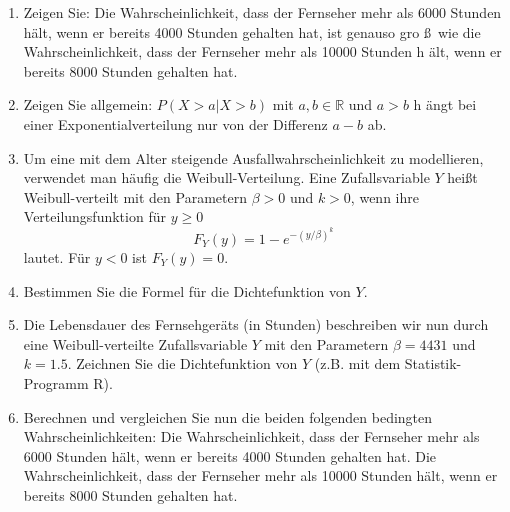 \begin{enumerate}
\begin{enumerate}
\item Zeigen Sie: Die Wahrscheinlichkeit, dass der Fernseher mehr als 6000
Stunden h\"{a}lt, wenn er bereits 4000 Stunden gehalten hat, ist genauso gro%
\ss\ wie die Wahrscheinlichkeit, dass der Fernseher mehr als 10000 Stunden h%
\"{a}lt, wenn er bereits 8000 Stunden gehalten hat.
\item Zeigen Sie allgemein: $P(X>a|X>b)$ mit $a,b\in \mathbb{R}$ und $a>b$ h%
\"{a}ngt bei einer Exponentialverteilung nur von der Differenz $a-b$ ab.
\item Um eine mit dem Alter steigende Ausfallwahrscheinlichkeit zu
modellieren, verwendet man h\"{a}ufig die Weibull-Verteilung. Eine
Zufallsvariable $Y$ hei\ss t Weibull-verteilt mit den Parametern $\beta >0$
und $k>0$, wenn ihre Verteilungsfunktion f\"{u}r $y\geq 0$%
\begin{equation*}
F_{Y}(y)=1-e^{-(y/\beta )^{k}}
\end{equation*}%
lautet. F\"{u}r $y<0$ ist $F_{Y}(y)=0$.
\item Bestimmen Sie die Formel f\"{u}r die Dichtefunktion von $Y$.
\item Die Lebensdauer des Fernsehger\"{a}ts (in Stunden) beschreiben wir nun
durch eine Weibull-verteilte Zufallsvariable $Y$ mit den Parametern $\beta
=4431$ und $k=1.5.$ Zeichnen Sie die Dichtefunktion von $Y$ (z.B. mit dem
Statistik-Programm R).
\item Berechnen und vergleichen Sie nun die beiden folgenden bedingten
Wahrscheinlichkeiten: Die Wahrscheinlichkeit, dass der Fernseher mehr als
6000 Stunden h\"{a}lt, wenn er bereits 4000 Stunden gehalten hat. Die
Wahrscheinlichkeit, dass der Fernseher mehr als 10000 Stunden h\"{a}lt, wenn
er bereits 8000 Stunden gehalten hat.
\end{enumerate}
\end{enumerate}
